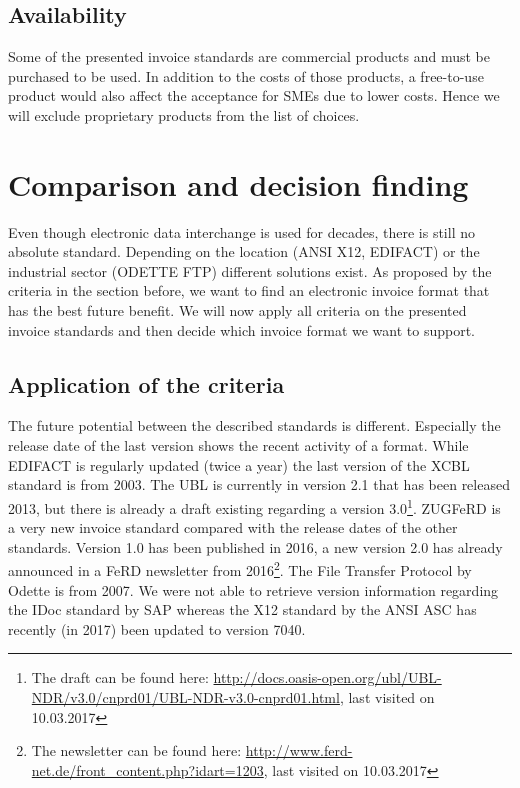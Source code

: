 \subsection{Availability}
\label{sec2.2.6}

Some of the presented invoice standards are commercial products and must be purchased to be used. In addition to the costs of those products, a free-to-use product would also affect the acceptance for SMEs due to lower costs. Hence we will exclude proprietary products from the list of choices. 

\section{Comparison and decision finding}
\label{sec2.3}

Even though electronic data interchange is used for decades, there is still no absolute standard. Depending on the location (ANSI X12, EDIFACT) or the industrial sector (ODETTE FTP) different solutions exist. As proposed by the criteria in the section before, we want to find an electronic invoice format that has the best future benefit. We will now apply all criteria on the presented invoice standards and then decide which invoice format we want to support.

\subsection{Application of the criteria}
\label{sec2.3.1}

The future potential between the described standards is different. Especially the release date of the last version shows the recent activity of a format. While EDIFACT is regularly updated (twice a year) the last version of the XCBL standard is from 2003. The UBL is currently in version 2.1 that has been released 2013, but there is already a draft existing regarding a version 3.0\footnote{The draft can be found here: \url{http://docs.oasis-open.org/ubl/UBL-NDR/v3.0/cnprd01/UBL-NDR-v3.0-cnprd01.html}, last visited on 10.03.2017}. ZUGFeRD is a very new invoice standard compared with the release dates of the other standards. Version 1.0 has been published in 2016, a new version 2.0 has already announced in a FeRD newsletter from 2016\footnote{The newsletter can be found here: \url{http://www.ferd-net.de/front_content.php?idart=1203}, last visited on 10.03.2017}. The File Transfer Protocol by Odette is from 2007. We were not able to retrieve version information regarding the IDoc standard by SAP whereas the X12 standard by the ANSI ASC has recently (in 2017) been updated to version 7040.


